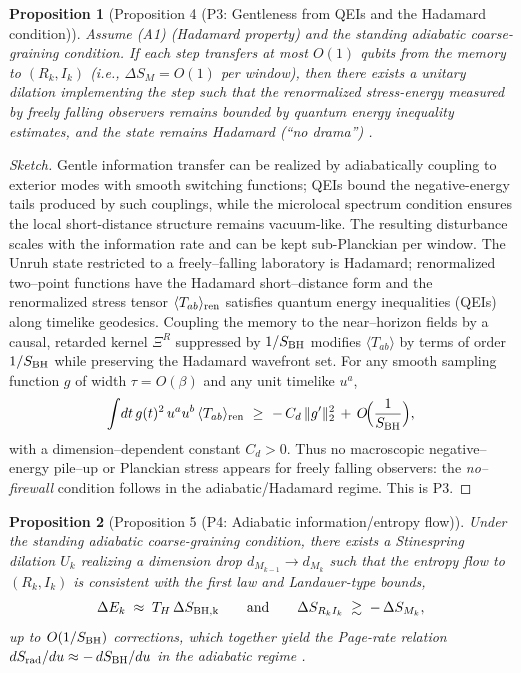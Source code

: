 \documentclass[a4paper,11pt]{article}
\newcommand{\ie}{i.e.\xspace}
\theoremstyle{plain}
\newtheorem{proposition}{Proposition}
\theoremstyle{definition}
\theoremstyle{remark}
\begin{document}
\begin{proposition}[Proposition 4 (P3: Gentleness from QEIs and the Hadamard condition)]
\label{prop:P3-gentle}
Assume (A1) (Hadamard property) and the standing adiabatic coarse-graining condition. If each step transfers at most $O(1)$ qubits from the memory to $(R_k,I_k)$
(\ie, $\Delta S_M=O(1)$ per window), then there exists a unitary dilation implementing the step such that the renormalized stress-energy
measured by freely falling observers remains bounded by quantum energy inequality estimates, and the state remains Hadamard
(``no drama'') \citep{Radzikowski:1996, Fewster:2012}.
\end{proposition}
\begin{proof}[Sketch]
Gentle information transfer can be realized by adiabatically coupling to exterior modes with smooth switching functions; QEIs bound the
negative-energy tails produced by such couplings, while the microlocal spectrum condition ensures the local short-distance structure
remains vacuum-like. The resulting disturbance scales with the information rate and can be kept sub-Planckian per window.
The Unruh state restricted to a freely--falling laboratory is Hadamard; renormalized two--point functions have the Hadamard short--distance form and the renormalized stress tensor $\langle T_{ab}\rangle_{\rm ren}$ satisfies quantum energy inequalities (QEIs) along timelike geodesics. Coupling the memory to the near--horizon fields by a causal, retarded kernel $\Xi^R$ suppressed by $1/S_{\rm BH}$ modifies $\langle T_{ab}\rangle$ by terms of order $1/S_{\rm BH}$ while preserving the Hadamard wavefront set. For any smooth sampling function $g$ of width $\tau=O(\beta)$ and any unit timelike $u^a$,
\begin{equation}
\int\!dt\,g(t)^2\,u^a u^b\,\langle T_{ab}\rangle_{\rm ren} \ \ge\ -\,C_d\,\|g'\|_2^2 \,+\,O\!\Big(\frac{1}{S_{\rm BH}}\Big),
\end{equation}
with a dimension--dependent constant $C_d>0$. Thus no macroscopic negative--energy pile--up or Planckian stress appears for freely falling observers: the \emph{no--firewall} condition follows in the adiabatic/Hadamard regime. This is P3.
\end{proof}
\begin{proposition}[Proposition 5 (P4: Adiabatic information/entropy flow)]
\label{prop:P4-adiabatic}
Under the standing adiabatic coarse-graining condition, there exists a Stinespring dilation $U_k$ realizing a dimension drop $d_{M_{k-1}}\!\to d_{M_k}$ such that the entropy flow to
$(R_k,I_k)$ is consistent with the first law and Landauer-type bounds,
\[
\Delta E_k \;\approx\; T_H\,\Delta S_{\rm BH,k}\qquad\text{and}\qquad \Delta S_{R_k I_k}\;\gtrsim\; -\,\Delta S_{M_k},
\]
up to $O(1/S_{\rm BH})$ corrections, which together yield the Page-rate relation $dS_{\rm rad}/du \approx -\,dS_{\rm BH}/du$ in the
adiabatic regime \citep{Page:1993, BrownYork:1993, Brandao:2016}.
\end{proposition}
\end{document}
